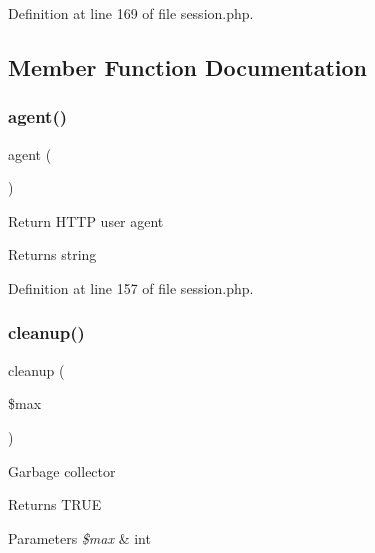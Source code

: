 Definition at line 169 of file session.\+php.



\subsection{Member Function Documentation}
\hypertarget{class_d_b_1_1_s_q_l_1_1_session_a77f6a261d70e66c7b7273774832482dc}{}\label{class_d_b_1_1_s_q_l_1_1_session_a77f6a261d70e66c7b7273774832482dc} 
\subsubsection{\texorpdfstring{agent()}{agent()}}
{\footnotesize\ttfamily agent (\begin{DoxyParamCaption}{ }\end{DoxyParamCaption})}

Return H\+T\+TP user agent \begin{DoxyReturn}{Returns}
string 
\end{DoxyReturn}


Definition at line 157 of file session.\+php.

\hypertarget{class_d_b_1_1_s_q_l_1_1_session_a60b027eb0df6d42b8fe2ec8c93cfbbae}{}\label{class_d_b_1_1_s_q_l_1_1_session_a60b027eb0df6d42b8fe2ec8c93cfbbae} 
\subsubsection{\texorpdfstring{cleanup()}{cleanup()}}
{\footnotesize\ttfamily cleanup (\begin{DoxyParamCaption}\item[{}]{\$max }\end{DoxyParamCaption})}

Garbage collector \begin{DoxyReturn}{Returns}
T\+R\+UE 
\end{DoxyReturn}

\begin{DoxyParams}{Parameters}
{\em \$max} & int \\
\hline
\end{DoxyParams}


